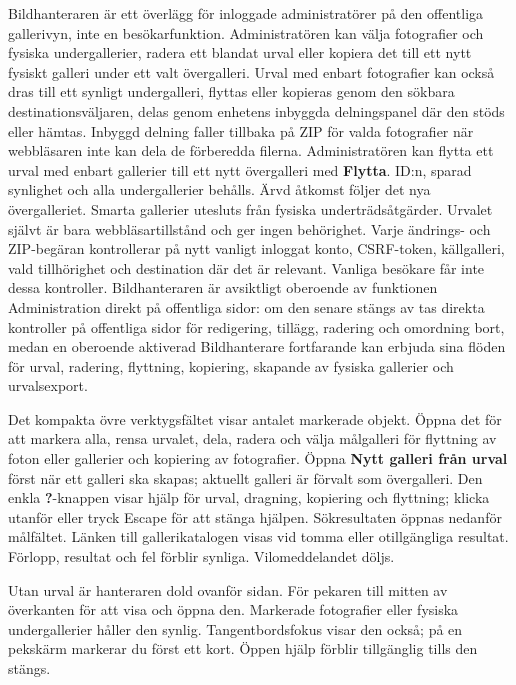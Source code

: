 \documentclass[11pt,a4paper]{article}
\newcommand{\ui}[1]{\textbf{#1}}
\begin{document}
Bildhanteraren är ett överlägg för inloggade administratörer på den offentliga
gallerivyn, inte en besökarfunktion. Administratören kan välja fotografier och
fysiska undergallerier, radera ett blandat urval eller kopiera det till ett nytt
fysiskt galleri under ett valt övergalleri. Urval med enbart fotografier kan
också dras till ett synligt undergalleri, flyttas eller kopieras genom den
sökbara destinationsväljaren, delas genom enhetens inbyggda delningspanel där
den stöds eller hämtas. Inbyggd delning faller tillbaka på ZIP för valda
fotografier när webbläsaren inte kan dela de förberedda filerna. Administratören
kan flytta ett urval med enbart gallerier till ett nytt övergalleri med \ui{Flytta}.
ID:n, sparad synlighet och alla undergallerier behålls. Ärvd åtkomst följer
det nya övergalleriet. Smarta
gallerier utesluts från fysiska underträdsåtgärder. Urvalet självt är bara
webbläsartillstånd och ger ingen behörighet. Varje ändrings- och ZIP-begäran
kontrollerar på nytt vanligt inloggat konto, CSRF-token, källgalleri, vald
tillhörighet och destination där det är relevant. Vanliga besökare får inte
dessa kontroller. Bildhanteraren är avsiktligt oberoende av funktionen
Administration direkt på offentliga sidor: om den senare stängs av tas direkta
kontroller på offentliga sidor för redigering, tillägg, radering och omordning
bort, medan en oberoende aktiverad Bildhanterare fortfarande kan erbjuda sina
flöden för urval, radering, flyttning, kopiering, skapande av fysiska gallerier
och urvalsexport.

Det kompakta övre verktygsfältet visar antalet markerade objekt. Öppna det
för att markera alla, rensa urvalet, dela, radera och välja målgalleri för
flyttning av foton eller gallerier och kopiering av fotografier.
Öppna \ui{Nytt galleri från urval}
först när ett galleri ska skapas; aktuellt galleri är förvalt som övergalleri.
Den enkla \ui{?}-knappen visar hjälp för urval, dragning, kopiering och
flyttning; klicka utanför eller tryck Escape för att stänga hjälpen.
Sökresultaten öppnas nedanför målfältet. Länken till gallerikatalogen visas
vid tomma eller otillgängliga resultat. Förlopp, resultat och fel förblir
synliga. Vilomeddelandet döljs.

Utan urval är hanteraren dold ovanför sidan. För pekaren till mitten av
överkanten för att visa och öppna den. Markerade fotografier eller fysiska
undergallerier håller den synlig. Tangentbordsfokus visar den också; på
en pekskärm markerar du först ett kort. Öppen hjälp förblir tillgänglig
tills den stängs.
\end{document}
